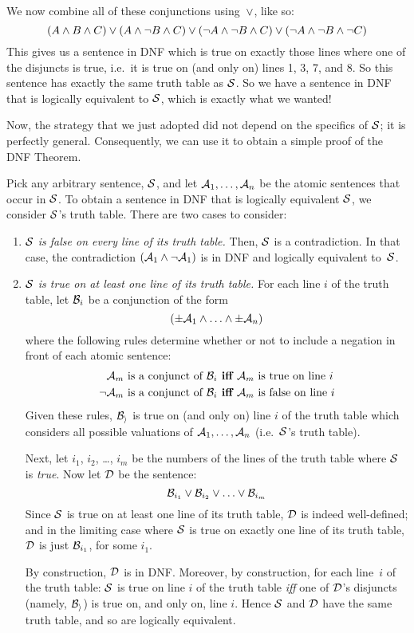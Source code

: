 We now combine all of these conjunctions using~$\vee$, like so:
$$(A \wedge B \wedge C) \vee (A \wedge \neg B \wedge C) \vee (\neg A \wedge \neg B \wedge C) \vee (\neg A \wedge \neg B \wedge \neg C)$$\label{longDNF}
This gives us a sentence in DNF which is true on exactly those lines where one of the disjuncts is true, i.e.\ it is true on (and only on) lines 1, 3, 7, and 8. So this sentence has exactly the same truth table as $\mathcal{S}$. So we have a sentence in DNF that is logically equivalent to $\mathcal{S}$, which is exactly what we wanted!

Now, the strategy that we just adopted did not depend on the specifics of $\mathcal{S}$; it is perfectly general. Consequently, we can use it to obtain a simple proof of the DNF Theorem.

Pick any arbitrary sentence, $\mathcal{S}$, and let $\mathcal{A}_1, \ldots, \mathcal{A}_n$ be the atomic sentences that occur in $\mathcal{S}$. To obtain a sentence in DNF that is logically equivalent $\mathcal{S}$, we consider $\mathcal{S}$'s truth table. There are two cases to consider:
	\begin{enumerate}
		\item \emph{$\mathcal{S}$ is false on every line of its truth table.} Then, $\mathcal{S}$ is a contradiction. In that case, the contradiction $(\mathcal{A}_1 \wedge \neg \mathcal{A}_1)$ is in DNF and logically equivalent to~$\mathcal{S}$.
	
		\item \emph{$\mathcal{S}$ is true on at least one line of its truth table.}
		For each line $i$ of the truth table, let $\mathcal{B}_i$ be a conjunction of the form 
		$$(\pm\mathcal{A}_1 \land \ldots \land \pm\mathcal{A}_n)$$
		where the following rules determine whether or not to include a negation in front of each atomic sentence:
			\begin{align*}
				\mathcal{A}_m\text{ is a conjunct of }\mathcal{B}_i&\textbf{ iff }\mathcal{A}_m\text{ is true on line }i\\
				\neg\mathcal{A}_m\text{ is a conjunct of }\mathcal{B}_i&\textbf{ iff }\mathcal{A}_m\text{ is false on line }i
			\end{align*}
		Given these rules, $\mathcal{B_i}$ is true on (and only on) line $i$ of the truth table which considers all possible valuations of $\mathcal{A}_1, \ldots, \mathcal{A}_n$ (i.e.\ $\mathcal{S}$'s truth table).
		
		Next, let $i_1$, $i_2$, \dots, $i_m$ be the numbers of the lines of the truth table where $\mathcal{S}$ is \emph{true}. Now let $\mathcal{D}$ be the sentence:
		$$\mathcal{B}_{i_1} \vee \mathcal{B}_{i_2} \vee \ldots \vee \mathcal{B}_{i_m}$$
		Since $\mathcal{S}$ is true on at least one line of its truth table, $\mathcal{D}$ is indeed well-defined; and in the limiting case where $\mathcal{S}$ is true on exactly one line of its truth table, $\mathcal{D}$ is just $\mathcal{B}_{i_1}$, for some $i_1$.
		
		By construction, $\mathcal{D}$ is in DNF. Moreover, by construction, for each line~$i$ of the truth table: $\mathcal{S}$ is true on line $i$ of the truth table \emph{iff} one of $\mathcal{D}$'s disjuncts (namely, $\mathcal{B_i}$) is true on, and only on, line $i$. Hence $\mathcal{S}$ and $\mathcal{D}$ have the same truth table, and so are logically equivalent.
	\end{enumerate}
